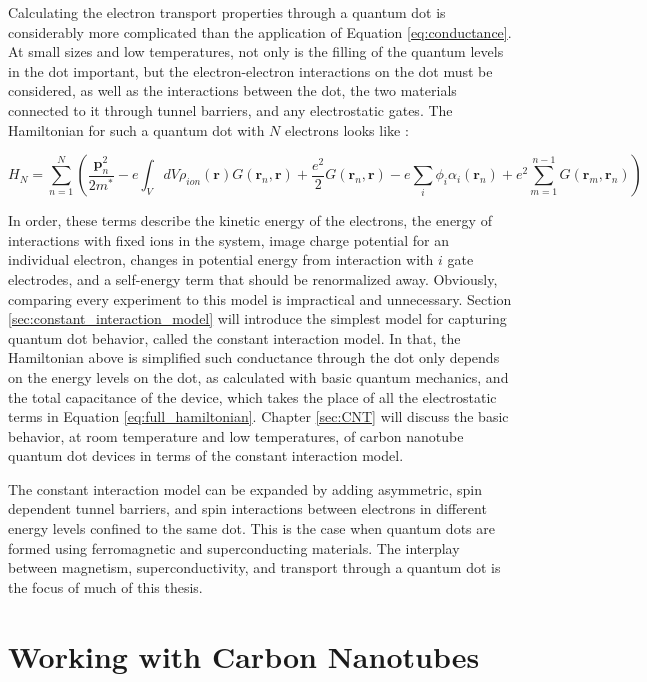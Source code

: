 Calculating the electron transport properties through a quantum dot is considerably more complicated than the application of Equation \ref{eq:conductance}. At small sizes and low temperatures, not only is the filling of the quantum levels in the dot important, but the electron-electron interactions on the dot must be considered, as well as the interactions between the dot, the two materials connected to it through tunnel barriers, and any electrostatic gates. The Hamiltonian for such a quantum dot with $N$ electrons looks like \cite{Ihn2004}:

\begin{equation}
\label{eq:full_hamiltonian}
    H_N = \sum_{n=1}^N \left( \frac{\mathbf{p}_n^2}{2m^*} - e \int_V dV \rho_{ion}(\mathbf{r})G(\mathbf{r}_n, \mathbf{r}) + \frac{e^2}{2} G(\mathbf{r}_n, \mathbf{r}) - e \sum_i \phi_i \alpha_i (\mathbf{r}_n) + e^2 \sum_{m=1}^{n-1} G(\mathbf{r}_m, \mathbf{r}_n) \right)
\end{equation}

In order, these terms describe the kinetic energy of the electrons, the energy of interactions with fixed ions in the system, image charge potential for an individual electron, changes in potential energy from interaction with $i$ gate electrodes, and a self-energy term that should be renormalized away. Obviously, comparing every experiment to this model is impractical and unnecessary. Section \ref{sec:constant_interaction_model} will introduce the simplest model for capturing quantum dot behavior, called the constant interaction model. In that, the Hamiltonian above is simplified such conductance through the dot only depends on the energy levels on the dot, as calculated with basic quantum mechanics, and the total capacitance of the device, which takes the place of all the electrostatic terms in Equation \ref{eq:full_hamiltonian}. Chapter \ref{sec:CNT} will discuss the basic behavior, at room temperature and low temperatures, of carbon nanotube quantum dot devices in terms of the constant interaction model.

The constant interaction model can be expanded by adding asymmetric, spin dependent tunnel barriers, and spin interactions between electrons in different energy levels confined to the same dot. This is the case when quantum dots are formed using ferromagnetic and superconducting materials. The interplay between magnetism, superconductivity, and transport through a quantum dot is the focus of much of this thesis. 

\section{Working with Carbon Nanotubes}

